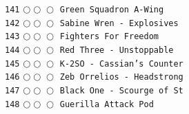 \documentclass[a4paper,landscape]{article}
\begin{document}
\begin{multicols*}{5}
\texttt{141} \(\bigcirc\!\bigcirc\!\bigcirc\)  \texttt{Green Squadron A-Wing} \vspace{-0.3mm}\\ 
\texttt{142} \(\bigcirc\!\bigcirc\!\bigcirc\)  \texttt{Sabine Wren - Explosives } \vspace{-0.3mm}\\ 
\texttt{143} \(\bigcirc\!\bigcirc\!\bigcirc\)  \texttt{Fighters For Freedom} \vspace{-0.3mm}\\ 
\texttt{144} \(\bigcirc\!\bigcirc\!\bigcirc\)  \texttt{Red Three - Unstoppable} \vspace{-0.3mm}\\ 
\texttt{145} \(\bigcirc\!\bigcirc\!\bigcirc\)  \texttt{K-2SO - Cassian's Counter} \vspace{-0.3mm}\\ 
\texttt{146} \(\bigcirc\!\bigcirc\!\bigcirc\)  \texttt{Zeb Orrelios - Headstrong} \vspace{-0.3mm}\\ 
\texttt{147} \(\bigcirc\!\bigcirc\!\bigcirc\)  \texttt{Black One - Scourge of St} \vspace{-0.3mm}\\ 
\texttt{148} \(\bigcirc\!\bigcirc\!\bigcirc\)  \texttt{Guerilla Attack Pod} \vspace{-0.3mm}\\ 

\end{multicols*}
\end{document}
